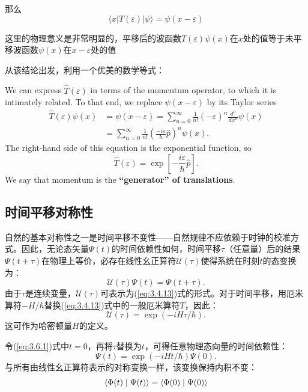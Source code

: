 那么
\begin{equation}
	\langle x|T(\varepsilon)|\psi\rangle = \psi(x - \varepsilon)
\end{equation}

这里的物理意义是非常明显的，平移后的波函数$T(\varepsilon )\psi \left( x \right)$在$x$处的值等于未平移波函数$\psi \left( x \right)$在$x-\varepsilon $处的值\par
从该结论出发，利用一个优美的数学等式：\par
We can express \(\hat{T}(\varepsilon)\) in terms of the momentum operator, to which it is intimately related. To that end, we replace \(\psi(x - \varepsilon)\) by its Taylor series
\begin{equation}
	\begin{aligned}
		\hat{T}(\varepsilon) \psi(x) &= \psi(x-\varepsilon) = \sum_{n=0}^{\infty} \frac{1}{n!} (-\varepsilon)^n \frac{d^n}{dx^n} \psi(x) \\
		&= \sum_{n=0}^{\infty} \frac{1}{n!} \left( \frac{-i \varepsilon}{\hbar} \hat{p} \right)^n \psi(x).
	\end{aligned}
\end{equation}
The right-hand side of this equation is the exponential function, so
\begin{equation}
	\hat{T}(\varepsilon) = \exp\left[ -\frac{i \varepsilon}{\hbar} \hat{p} \right].
\end{equation}
We say that momentum is the \textbf{``generator'' of translations}.
\subsection{时间平移对称性}
自然的基本对称性之一是时间平移不变性——自然规律不应依赖于时钟的校准方式。因此，无论态矢量$\Psi(t)$的时间依赖性如何，时间平移$\tau$（任意量）后的结果$\Psi(t+\tau)$在物理上等价，必存在线性幺正算符$\mathscr{U}(\tau)$使得系统在时刻$t$的态变换为：
\begin{equation}
	\mathscr{U}(\tau)\Psi(t)=\Psi(t+\tau). \label{eq:3.6.1}
\end{equation}
由于$\tau$是连续变量，$\mathscr{U}(\tau)$可表示为(\ref{eq:3.4.13})式的形式。对于时间平移，用厄米算符$-H/\hbar$替换\newline(\ref{eq:3.4.13})式中的一般厄米算符$T$，因此：
\begin{equation}
	\mathscr{U}(\tau)=\exp(-iH\tau/\hbar).
\end{equation}
这可作为哈密顿量$H$的定义。

令(\ref{eq:3.6.1})式中$t=0$，再将$\tau$替换为$t$，可得任意物理态向量的时间依赖性：
\begin{equation}
	\Psi(t)=\exp(-iHt/\hbar)\Psi(0). \label{(3.6.3)}
\end{equation}
与所有由线性幺正算符表示的对称变换一样，该变换保持内积不变：
\begin{equation}
	\left\langle {{\Phi (t)}}
	\mathrel{\left | {\vphantom {{\Phi (t)} {\Psi (t)}}}
		\right. \kern-\nulldelimiterspace}
	{{\Psi (t)}} \right\rangle  = \left\langle {{\Phi (0)}}
	\mathrel{\left | {\vphantom {{\Phi (0)} {\Psi (0)}}}
		\right. \kern-\nulldelimiterspace}
	{{\Psi (0)}} \right\rangle 
\end{equation}

